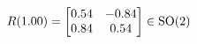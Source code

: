 \documentclass[preview]{standalone}
\begin{document}
\begin{align*}
\special{dvisvgm:raw <g id='unique000'>}R(1.00) = \begin{bmatrix} 0.54 & -0.84 \\ 0.84 & 0.54 \end{bmatrix} \in \text{SO}(2)\special{dvisvgm:raw </g>}
\end{align*}
\end{document}
